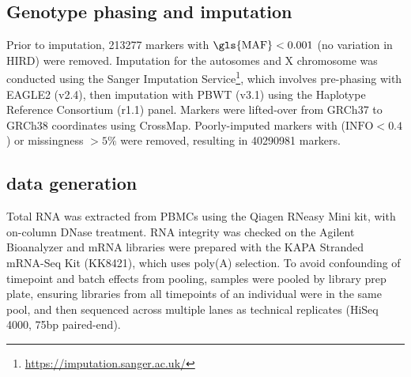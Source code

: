 \subsection{Genotype phasing and imputation}

Prior to imputation, 213277 markers with $\text{\gls{MAF}} < 0.001$ (no variation in \gls{HIRD}) were removed.
Imputation for the autosomes and X chromosome was conducted using the Sanger Imputation Service\footnote{\url{https://imputation.sanger.ac.uk/}}, which involves pre-phasing with EAGLE2 (v2.4), then imputation with PBWT (v3.1) using the Haplotype Reference Consortium (r1.1) panel.
Markers were lifted-over from GRCh37 to GRCh38 coordinates using CrossMap.
Poorly-imputed markers with ($\text{INFO} < 0.4$) or missingness $> 5\%$ were removed, resulting in 40290981 markers.

\subsection{ data generation}

Total RNA was extracted from \glspl{PBMC} using the Qiagen RNeasy Mini kit, with on-column DNase treatment.
RNA integrity was checked on the Agilent Bioanalyzer and mRNA libraries were prepared with the KAPA Stranded mRNA-Seq Kit (KK8421), which uses poly(A) selection.
To avoid confounding of timepoint and batch effects from pooling, samples were pooled by library prep plate, ensuring libraries from all timepoints of an individual were in the same pool, and then sequenced across multiple lanes as technical replicates (HiSeq 4000, 75bp paired-end).

